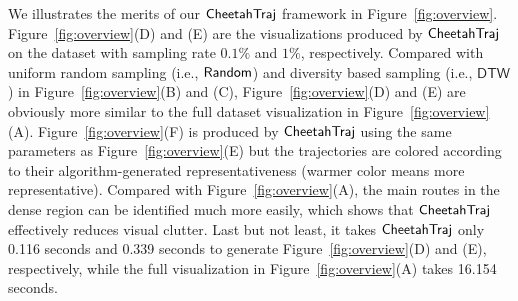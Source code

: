 We illustrates the merits of our $\mathsf{CheetahTraj}$ framework in Figure~\ref{fig:overview}. Figure~\ref{fig:overview}(D) and (E) are the visualizations produced by $\mathsf{CheetahTraj}{}$ on the \pt{} dataset with sampling rate $0.1\%$ and $1\%$, respectively. Compared with uniform random sampling (i.e., $\mathsf{Random}$) and diversity based sampling (i.e., $\mathsf{DTW}$) in Figure~\ref{fig:overview}(B) and (C), Figure~\ref{fig:overview}(D) and (E) are obviously more similar to the full dataset visualization in Figure~\ref{fig:overview}(A).
Figure~\ref{fig:overview}(F) is produced by $\mathsf{CheetahTraj}{}$ using the same parameters as Figure~\ref{fig:overview}(E) but the trajectories are colored according to their algorithm-generated representativeness (warmer color means more representative). Compared with Figure~\ref{fig:overview}(A), the main routes in the dense region can be identified much more easily, which shows that $\mathsf{CheetahTraj}{}$ effectively reduces visual clutter. Last but not least, it takes $\mathsf{CheetahTraj}{}$ only 0.116 seconds and 0.339 seconds to generate Figure~\ref{fig:overview}(D) and (E), respectively, while the full visualization in Figure~\ref{fig:overview}(A) takes 16.154 seconds.






